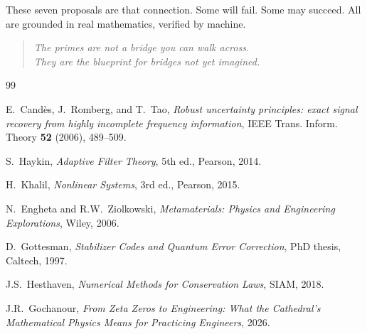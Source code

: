 \documentclass[11pt,a4paper]{article}
\begin{document}
These seven proposals are that connection. Some will fail. Some may
succeed. All are grounded in real mathematics, verified by machine.

\begin{quote}
\emph{The primes are not a bridge you can walk across.\\
They are the blueprint for bridges not yet imagined.}
\end{quote}

\vspace{0.5cm}

\begin{thebibliography}{99}

E.~Cand\`es, J.~Romberg, and T.~Tao, \emph{Robust uncertainty
principles: exact signal recovery from highly incomplete frequency
information}, IEEE Trans. Inform. Theory \textbf{52} (2006), 489--509.

S.~Haykin, \emph{Adaptive Filter Theory}, 5th ed., Pearson, 2014.

H.~Khalil, \emph{Nonlinear Systems}, 3rd ed., Pearson, 2015.

N.~Engheta and R.W.~Ziolkowski, \emph{Metamaterials: Physics and
Engineering Explorations}, Wiley, 2006.

D.~Gottesman, \emph{Stabilizer Codes and Quantum Error Correction},
PhD thesis, Caltech, 1997.

J.S.~Hesthaven, \emph{Numerical Methods for Conservation Laws},
SIAM, 2018.

J.R.~Gochanour, \emph{From Zeta Zeros to Engineering: What the
Cathedral's Mathematical Physics Means for Practicing Engineers},
2026.

\end{thebibliography}
\end{document}
